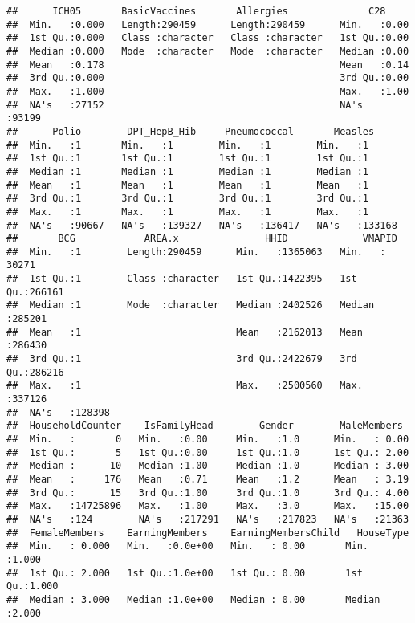 \documentclass[
]{article}
\begin{document}
\begin{verbatim}
##      ICH05       BasicVaccines       Allergies              C28       
##  Min.   :0.000   Length:290459      Length:290459      Min.   :0.00   
##  1st Qu.:0.000   Class :character   Class :character   1st Qu.:0.00   
##  Median :0.000   Mode  :character   Mode  :character   Median :0.00   
##  Mean   :0.178                                         Mean   :0.14   
##  3rd Qu.:0.000                                         3rd Qu.:0.00   
##  Max.   :1.000                                         Max.   :1.00   
##  NA's   :27152                                         NA's   :93199  
##      Polio        DPT_HepB_Hib     Pneumococcal       Measles      
##  Min.   :1       Min.   :1        Min.   :1        Min.   :1       
##  1st Qu.:1       1st Qu.:1        1st Qu.:1        1st Qu.:1       
##  Median :1       Median :1        Median :1        Median :1       
##  Mean   :1       Mean   :1        Mean   :1        Mean   :1       
##  3rd Qu.:1       3rd Qu.:1        3rd Qu.:1        3rd Qu.:1       
##  Max.   :1       Max.   :1        Max.   :1        Max.   :1       
##  NA's   :90667   NA's   :139327   NA's   :136417   NA's   :133168  
##       BCG            AREA.x               HHID             VMAPID      
##  Min.   :1        Length:290459      Min.   :1365063   Min.   : 30271  
##  1st Qu.:1        Class :character   1st Qu.:1422395   1st Qu.:266161  
##  Median :1        Mode  :character   Median :2402526   Median :285201  
##  Mean   :1                           Mean   :2162013   Mean   :286430  
##  3rd Qu.:1                           3rd Qu.:2422679   3rd Qu.:286216  
##  Max.   :1                           Max.   :2500560   Max.   :337126  
##  NA's   :128398                                                        
##  HouseholdCounter    IsFamilyHead        Gender        MaleMembers   
##  Min.   :       0   Min.   :0.00     Min.   :1.0      Min.   : 0.00  
##  1st Qu.:       5   1st Qu.:0.00     1st Qu.:1.0      1st Qu.: 2.00  
##  Median :      10   Median :1.00     Median :1.0      Median : 3.00  
##  Mean   :     176   Mean   :0.71     Mean   :1.2      Mean   : 3.19  
##  3rd Qu.:      15   3rd Qu.:1.00     3rd Qu.:1.0      3rd Qu.: 4.00  
##  Max.   :14725896   Max.   :1.00     Max.   :3.0      Max.   :15.00  
##  NA's   :124        NA's   :217291   NA's   :217823   NA's   :21363  
##  FemaleMembers    EarningMembers    EarningMembersChild   HouseType    
##  Min.   : 0.000   Min.   :0.0e+00   Min.   : 0.00       Min.   :1.000  
##  1st Qu.: 2.000   1st Qu.:1.0e+00   1st Qu.: 0.00       1st Qu.:1.000  
##  Median : 3.000   Median :1.0e+00   Median : 0.00       Median :2.000  

\end{verbatim}
\end{document}
